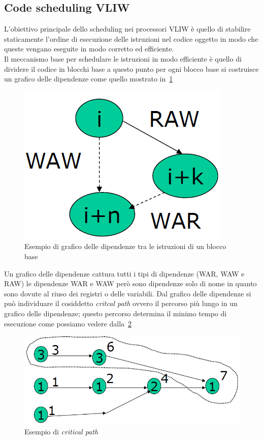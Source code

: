 \subsection{Code scheduling VLIW}
L'obiettivo principale dello scheduling nei processori VLIW è quello di stabilire staticamente l'ordine di esecuzione delle istruzioni nel codice oggetto in modo che queste vengano eseguite in modo corretto ed efficiente.\\
Il meccanismo base per schedulare le istruzioni in modo efficiente è quello di dividere il codice in blocchi base a questo punto per ogni blocco base si costruisce un grafico delle dipendenze come quello mostrato in \figurename\,\ref{fig:depgrap}
\begin{figure}[htb]
\centering
\includegraphics[scale=0.5]{img/depgrap.png}
\caption{Esempio di grafico delle dipendenze tra le istruzioni di un blocco base}\label{fig:depgrap}
\end{figure}
Un grafico delle dipendenze cattura tutti i tipi di dipendenze (WAR, WAW e RAW) le dipendenze WAR e WAW però sono dipendenze solo di nome in quanto sono dovute al riuso dei registri o delle variabili. Dal grafico delle dipendenze si può individuare il cosiddetto \emph{critcal path} ovvero il percorso più lungo in un grafico delle dipendenze; questo percorso determina il minimo tempo di esecuzione come possiamo vedere dalla \figurename\,\ref{fig:criticalpath}
\begin{figure}[htb]
\centering
\includegraphics[scale=0.5]{img/criticalpath.png}
\caption{Esempio di \emph{critical path}}\label{fig:criticalpath}
\end{figure}
